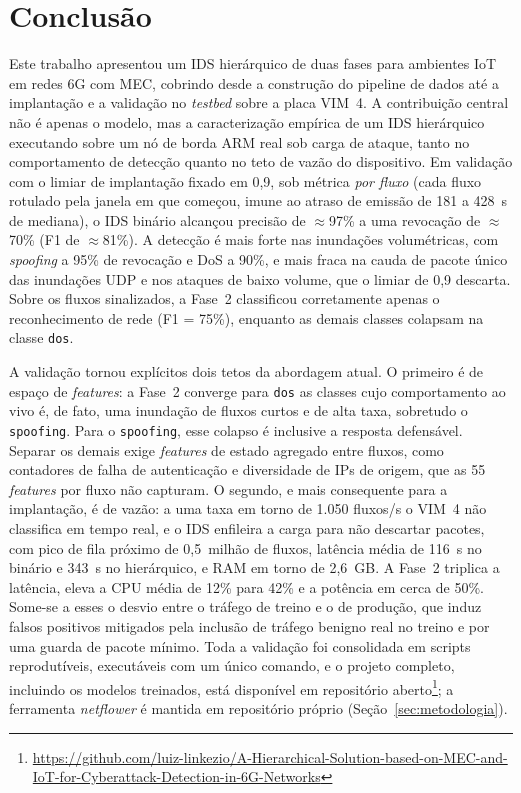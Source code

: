 \documentclass[12pt]{article}
\begin{document}
\section{Conclusão}
\label{sec:conclusao}

Este trabalho apresentou um IDS hierárquico de duas fases para ambientes IoT em
redes 6G com MEC, cobrindo desde a construção do pipeline de dados até a
implantação e a validação no \textit{testbed} sobre a placa VIM~4. A contribuição
central não é apenas o modelo, mas a caracterização empírica de um IDS
hierárquico executando sobre um nó de borda ARM real sob carga de ataque, tanto
no comportamento de detecção quanto no teto de vazão do dispositivo. Em validação
com o limiar de implantação fixado em 0,9, sob métrica \emph{por fluxo} (cada
fluxo rotulado pela janela em que começou, imune ao atraso de emissão de 181 a
428~s de mediana), o IDS binário alcançou precisão de $\approx$97\% a uma
revocação de $\approx$70\% (F1 de $\approx$81\%). A detecção é mais forte nas
inundações volumétricas, com \textit{spoofing} a 95\% de revocação e DoS a 90\%,
e mais fraca na cauda de pacote único das inundações UDP e nos ataques de baixo
volume, que o limiar de 0,9 descarta. Sobre os fluxos sinalizados, a Fase~2
classificou corretamente apenas o reconhecimento de rede (F1 = 75\%), enquanto as
demais classes colapsam na classe \texttt{dos}.

A validação tornou explícitos dois tetos da abordagem atual. O primeiro é de
espaço de \textit{features}: a Fase~2 converge para \texttt{dos} as classes cujo
comportamento ao vivo é, de fato, uma inundação de fluxos curtos e de alta taxa,
sobretudo o \texttt{spoofing}. Para o \texttt{spoofing}, esse colapso é inclusive
a resposta defensável. Separar os demais exige \textit{features} de estado
agregado entre fluxos, como contadores de falha de autenticação e diversidade de
IPs de origem, que as 55 \textit{features} por fluxo não capturam. O segundo, e
mais consequente para a implantação, é de vazão: a uma taxa em torno de 1.050
fluxos/s o VIM~4 não classifica em tempo real, e o IDS enfileira a carga para não
descartar pacotes, com pico de fila próximo de 0,5~milhão de fluxos, latência
média de 116~s no binário e 343~s no hierárquico, e RAM em torno de 2,6~GB. A
Fase~2 triplica a latência, eleva a CPU média de 12\% para 42\% e a potência em
cerca de 50\%. Some-se a esses o desvio entre o tráfego de treino e o de produção,
que induz falsos positivos mitigados pela inclusão de tráfego benigno real no
treino e por uma guarda de pacote mínimo. Toda a validação foi
consolidada em scripts reprodutíveis, executáveis com um único comando, e o
projeto completo, incluindo os modelos treinados, está disponível em repositório
aberto\footnote{\url{https://github.com/luiz-linkezio/A-Hierarchical-Solution-based-on-MEC-and-IoT-for-Cyberattack-Detection-in-6G-Networks}};
a ferramenta \textit{netflower} é mantida em repositório próprio
(Seção~\ref{sec:metodologia}).
\end{document}
